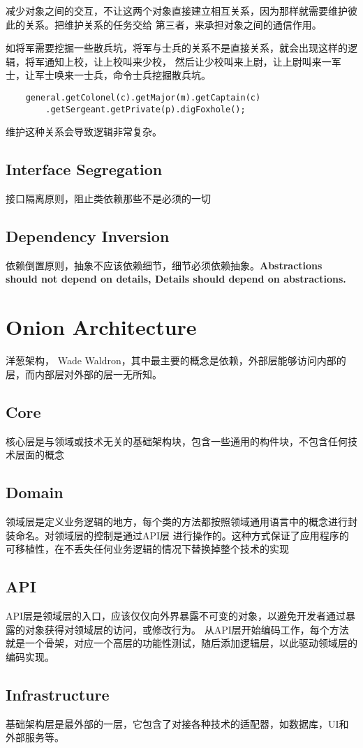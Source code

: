 减少对象之间的交互，不让这两个对象直接建立相互关系，因为那样就需要维护彼此的关系。把维护关系的任务交给
第三者，来承担对象之间的通信作用。

如将军需要挖掘一些散兵坑，将军与士兵的关系不是直接关系，就会出现这样的逻辑，将军通知上校，让上校叫来少校，
然后让少校叫来上尉，让上尉叫来一军士，让军士唤来一士兵，命令士兵挖掘散兵坑。
\begin{lstlisting}
    general.getColonel(c).getMajor(m).getCaptain(c)
        .getSergeant.getPrivate(p).digFoxhole();
\end{lstlisting}
维护这种关系会导致逻辑非常复杂。

\subsection{Interface Segregation}
接口隔离原则，阻止类依赖那些不是必须的一切

\subsection{Dependency Inversion}
依赖倒置原则，抽象不应该依赖细节，细节必须依赖抽象。\textbf{Abstractions should not depend on details,
Details should depend on abstractions.}

\section{Onion Architecture}
洋葱架构， Wade Waldron，其中最主要的概念是依赖，外部层能够访问内部的层，而内部层对外部的层一无所知。

\subsection{Core}
核心层是与领域或技术无关的基础架构块，包含一些通用的构件块，不包含任何技术层面的概念

\subsection{Domain}
领域层是定义业务逻辑的地方，每个类的方法都按照领域通用语言中的概念进行封装命名。对领域层的控制是通过API层
进行操作的。这种方式保证了应用程序的可移植性，在不丢失任何业务逻辑的情况下替换掉整个技术的实现

\subsection{API}
API层是领域层的入口，应该仅仅向外界暴露不可变的对象，以避免开发者通过暴露的对象获得对领域层的访问，或修改行为。
从API层开始编码工作，每个方法就是一个骨架，对应一个高层的功能性测试，随后添加逻辑层，以此驱动领域层的编码实现。

\subsection{Infrastructure}
基础架构层是最外部的一层，它包含了对接各种技术的适配器，如数据库，UI和外部服务等。
